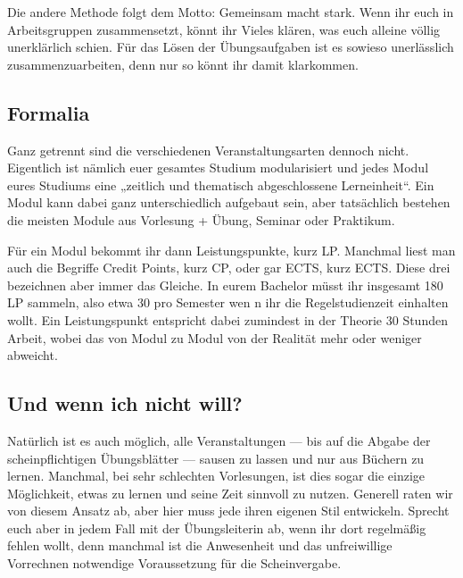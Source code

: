 Die andere Methode folgt dem Motto: \glqq{}Gemeinsam macht stark\grqq{}. Wenn ihr euch in Arbeitsgruppen zusammensetzt, könnt ihr Vieles klären, was euch alleine völlig unerklärlich schien. Für das Lösen der Übungsaufgaben ist es sowieso unerlässlich zusammenzuarbeiten, denn nur so könnt ihr damit klarkommen.

\subsection{Formalia}

Ganz getrennt sind die verschiedenen Veranstaltungsarten dennoch nicht. Eigentlich ist nämlich euer gesamtes Studium modularisiert und jedes Modul eures Studiums eine „zeitlich und thematisch abgeschlossene Lerneinheit“. Ein Modul kann dabei ganz unterschiedlich aufgebaut sein, aber tatsächlich bestehen die meisten Module aus Vorlesung + Übung, Seminar oder Praktikum.

Für ein Modul bekommt ihr dann Leistungspunkte, kurz \gls{LP}. Manchmal liest man auch die Begriffe Credit Points, kurz \gls{CP}, oder gar \gls{ECTS}, kurz ECTS. Diese drei bezeichnen aber immer das Gleiche. In eurem Bachelor müsst ihr insgesamt 180 \gls{LP} sammeln, also etwa 30 pro Semester wen n ihr die Regelstudienzeit einhalten wollt. Ein Leistungspunkt entspricht dabei zumindest in der Theorie 30 Stunden Arbeit, wobei das von Modul zu Modul von der Realität mehr oder weniger abweicht.

\subsection{Und wenn ich nicht will?}

Natürlich ist es auch möglich, alle Veranstaltungen --- bis auf die Abgabe der scheinpflichtigen Übungsblätter --- sausen zu lassen und nur aus Büchern zu lernen. Manchmal, bei sehr schlechten Vorlesungen, ist dies sogar die einzige Möglichkeit, etwas zu lernen und seine Zeit sinnvoll zu nutzen. Generell raten wir von diesem Ansatz ab, aber hier muss jede ihren eigenen Stil entwickeln. Sprecht euch aber in jedem Fall mit der Übungsleiterin ab, wenn ihr dort regelmäßig fehlen wollt, denn manchmal ist die Anwesenheit und das unfreiwillige Vorrechnen notwendige Voraussetzung für die Scheinvergabe.

\vfill\eject
